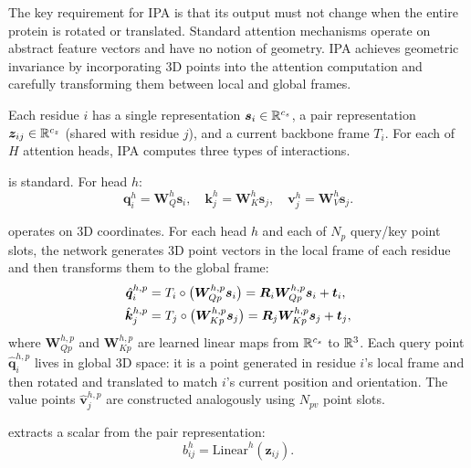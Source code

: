 The key requirement for IPA is that its output must not change when the entire protein is rotated or translated.
Standard attention mechanisms operate on abstract feature vectors and have no notion of geometry.
IPA achieves geometric invariance by incorporating 3D points into the attention computation and carefully transforming them between local and global frames.

Each residue $i$ has a single representation $\bm{s}_i \in \mathbb{R}^{c_s}$, a pair representation $\bm{z}_{ij} \in \mathbb{R}^{c_z}$ (shared with residue $j$), and a current backbone frame $T_i$.
For each of $H$ attention heads, IPA computes three types of interactions.

 is standard.  For head $h$:
\begin{equation}
\label{eq:ipa-scalar-qkv}
\bm{q}_i^h = \bm{W}_Q^h \bm{s}_i, \quad
\bm{k}_j^h = \bm{W}_K^h \bm{s}_j, \quad
\bm{v}_j^h = \bm{W}_V^h \bm{s}_j.
\end{equation}

 operates on 3D coordinates.  For each head $h$ and each of $N_p$ query/key point slots, the network generates 3D point vectors in the local frame of each residue and then transforms them to the global frame:
\begin{align}
\hat{\bm{q}}_{i}^{h,p} &= T_i \circ \bigl(\bm{W}_{Qp}^{h,p} \bm{s}_i\bigr) = \bm{R}_i \bm{W}_{Qp}^{h,p} \bm{s}_i + \bm{t}_i, \label{eq:ipa-point-q} \\
\hat{\bm{k}}_{j}^{h,p} &= T_j \circ \bigl(\bm{W}_{Kp}^{h,p} \bm{s}_j\bigr) = \bm{R}_j \bm{W}_{Kp}^{h,p} \bm{s}_j + \bm{t}_j, \label{eq:ipa-point-k}
\end{align}
where $\bm{W}_{Qp}^{h,p}$ and $\bm{W}_{Kp}^{h,p}$ are learned linear maps from $\mathbb{R}^{c_s}$ to $\mathbb{R}^3$.
Each query point $\hat{\bm{q}}_{i}^{h,p}$ lives in global 3D space: it is a point generated in residue $i$'s local frame and then rotated and translated to match $i$'s current position and orientation.
The value points $\hat{\bm{v}}_{j}^{h,p}$ are constructed analogously using $N_{pv}$ point slots.

 extracts a scalar from the pair representation:
\begin{equation}
\label{eq:ipa-pair-bias}
b_{ij}^h = \text{Linear}^h(\bm{z}_{ij}).
\end{equation}

